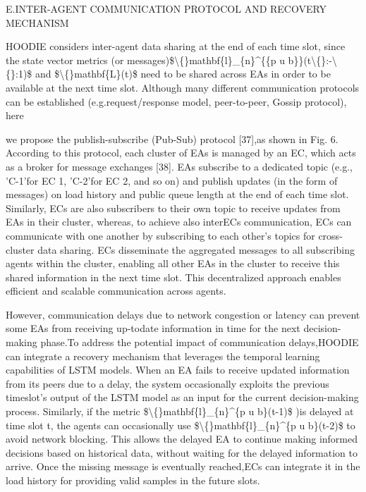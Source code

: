 \documentclass{article}
\begin{document}
E.INTER-AGENT COMMUNICATION PROTOCOL AND RECOVERY MECHANISM

HOODIE considers inter-agent data sharing at the end of each time slot, since the state vector metrics (or messages)\$\textbackslash\{\}mathbf\{l\}\_\{n\}\textasciicircum{}\{\{p u b\}\}(t\textbackslash\{\}:-\textbackslash\{\}:1)\$ and \$\textbackslash\{\}mathbf\{L\}(t)\$ need to be shared across EAs in order to be available at the next time slot. Although many different communication protocols can be established (e.g.request/response model, peer-to-peer, Gossip protocol), here

we propose the publish-subscribe (Pub-Sub) protocol [37],as shown in Fig. 6. According to this protocol, each cluster of EAs is managed by an EC, which acts as a broker for message exchanges [38]. EAs subscribe to a dedicated topic (e.g., 'C-1'for EC 1, 'C-2'for EC 2, and so on) and publish updates (in the form of messages) on load history and public queue length at the end of each time slot. Similarly, ECs are also subscribers to their own topic to receive updates from EAs in their cluster, whereas, to achieve also interECs communication, ECs can communicate with one another by subscribing to each other's topics for cross-cluster data sharing. ECs disseminate the aggregated messages to all subscribing agents within the cluster, enabling all other EAs in the cluster to receive this shared information in the next time slot. This decentralized approach enables efficient and scalable communication across agents.

However, communication delays due to network congestion or latency can prevent some EAs from receiving up-todate information in time for the next decision-making phase.To address the potential impact of communication delays,HOODIE can integrate a recovery mechanism that leverages the temporal learning capabilities of LSTM models. When an EA fails to receive updated information from its peers due to a delay, the system occasionally exploits the previous timeslot's output of the LSTM model as an input for the current decision-making process. Similarly, if the metric \$\textbackslash\{\}mathbf\{l\}\_\{n\}\textasciicircum{}\{p u b\}(t-1)\$ )is delayed at time slot t, the agents can occasionally use \$\textbackslash\{\}mathbf\{l\}\_\{n\}\textasciicircum{}\{p u b\}(t-2)\$ to avoid network blocking. This allows the delayed EA to continue making informed decisions based on historical data, without waiting for the delayed information to arrive. Once the missing message is eventually reached,ECs can integrate it in the load history for providing valid samples in the future slots.
\end{document}
